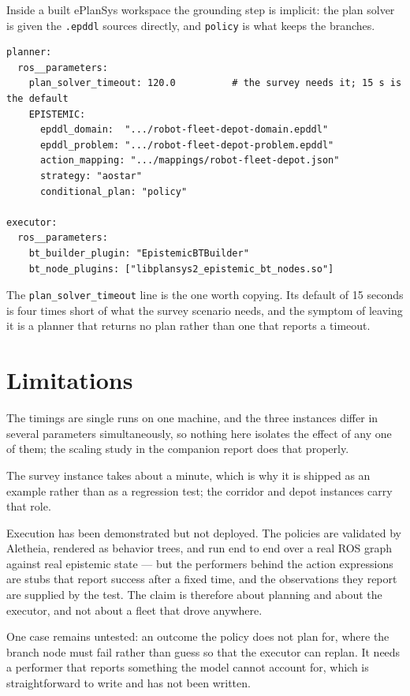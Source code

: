 \documentclass[11pt,a4paper]{article}
\begin{document}
\noindent
Inside a built ePlanSys workspace the grounding step is implicit: the plan
solver is given the \texttt{.epddl} sources directly, and \texttt{policy} is
what keeps the branches.

\begin{lstlisting}
planner:
  ros__parameters:
    plan_solver_timeout: 120.0          # the survey needs it; 15 s is the default
    EPISTEMIC:
      epddl_domain:  ".../robot-fleet-depot-domain.epddl"
      epddl_problem: ".../robot-fleet-depot-problem.epddl"
      action_mapping: ".../mappings/robot-fleet-depot.json"
      strategy: "aostar"
      conditional_plan: "policy"

executor:
  ros__parameters:
    bt_builder_plugin: "EpistemicBTBuilder"
    bt_node_plugins: ["libplansys2_epistemic_bt_nodes.so"]
\end{lstlisting}

\noindent
The \texttt{plan\_solver\_timeout} line is the one worth copying. Its default of
15 seconds is four times short of what the survey scenario needs, and the
symptom of leaving it is a planner that returns no plan rather than one that
reports a timeout.

\section{Limitations}

The timings are single runs on one machine, and the three instances differ in
several parameters simultaneously, so nothing here isolates the effect of any
one of them; the scaling study in the companion report does that properly.

The survey instance takes about a minute, which is why it is shipped as an
example rather than as a regression test; the corridor and depot instances carry
that role.

Execution has been demonstrated but not deployed. The policies are validated by
Aletheia, rendered as behavior trees, and run end to end over a real ROS graph
against real epistemic state --- but the performers behind the action
expressions are stubs that report success after a fixed time, and the
observations they report are supplied by the test. The claim is therefore about
planning and about the executor, and not about a fleet that drove anywhere.

One case remains untested: an outcome the policy does not plan for, where the
branch node must fail rather than guess so that the executor can replan. It
needs a performer that reports something the model cannot account for, which is
straightforward to write and has not been written.
\end{document}

